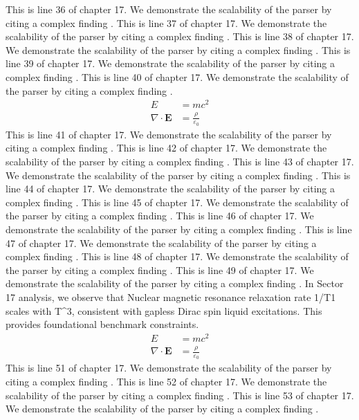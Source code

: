 This is line 36 of chapter 17. We demonstrate the scalability of the parser by citing a complex finding \cite{ref17_36}.
This is line 37 of chapter 17. We demonstrate the scalability of the parser by citing a complex finding \cite{ref17_37}.
This is line 38 of chapter 17. We demonstrate the scalability of the parser by citing a complex finding \cite{ref17_38}.
This is line 39 of chapter 17. We demonstrate the scalability of the parser by citing a complex finding \cite{ref17_39}.
This is line 40 of chapter 17. We demonstrate the scalability of the parser by citing a complex finding \cite{ref17_40}.
\begin{align*}
  E &= mc^2 \\
  \nabla \cdot \mathbf{E} &= \frac{\rho}{\varepsilon_0}
\end{align*}
This is line 41 of chapter 17. We demonstrate the scalability of the parser by citing a complex finding \cite{ref17_41}.
This is line 42 of chapter 17. We demonstrate the scalability of the parser by citing a complex finding \cite{ref17_42}.
This is line 43 of chapter 17. We demonstrate the scalability of the parser by citing a complex finding \cite{ref17_43}.
This is line 44 of chapter 17. We demonstrate the scalability of the parser by citing a complex finding \cite{ref17_44}.
This is line 45 of chapter 17. We demonstrate the scalability of the parser by citing a complex finding \cite{ref17_45}.
This is line 46 of chapter 17. We demonstrate the scalability of the parser by citing a complex finding \cite{ref17_46}.
This is line 47 of chapter 17. We demonstrate the scalability of the parser by citing a complex finding \cite{ref17_47}.
This is line 48 of chapter 17. We demonstrate the scalability of the parser by citing a complex finding \cite{ref17_48}.
This is line 49 of chapter 17. We demonstrate the scalability of the parser by citing a complex finding \cite{ref17_49}.
In Sector 17 analysis, we observe that Nuclear magnetic resonance relaxation rate 1/T1 scales with T^3, consistent with gapless Dirac spin liquid excitations. This provides foundational benchmark constraints.
\begin{align*}
  E &= mc^2 \\
  \nabla \cdot \mathbf{E} &= \frac{\rho}{\varepsilon_0}
\end{align*}
This is line 51 of chapter 17. We demonstrate the scalability of the parser by citing a complex finding \cite{ref17_51}.
This is line 52 of chapter 17. We demonstrate the scalability of the parser by citing a complex finding \cite{ref17_52}.
This is line 53 of chapter 17. We demonstrate the scalability of the parser by citing a complex finding \cite{ref17_53}.
